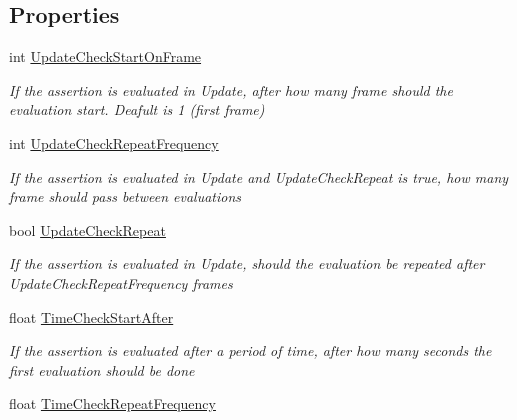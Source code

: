 \subsection*{Properties}
\begin{DoxyCompactItemize}
\item 
int \hyperlink{interface_unity_test_1_1_i_assertion_component_configurator_a315274f8d878046f66d7c3c6edd7066d}{Update\+Check\+Start\+On\+Frame}
\begin{DoxyCompactList}\small\item\em If the assertion is evaluated in Update, after how many frame should the evaluation start. Deafult is 1 (first frame) \end{DoxyCompactList}\item 
int \hyperlink{interface_unity_test_1_1_i_assertion_component_configurator_a1672eab17d77e0bb23584f47d0ed7ff4}{Update\+Check\+Repeat\+Frequency}
\begin{DoxyCompactList}\small\item\em If the assertion is evaluated in Update and Update\+Check\+Repeat is true, how many frame should pass between evaluations \end{DoxyCompactList}\item 
bool \hyperlink{interface_unity_test_1_1_i_assertion_component_configurator_afef9c91147b764223f81311095bd00d6}{Update\+Check\+Repeat}
\begin{DoxyCompactList}\small\item\em If the assertion is evaluated in Update, should the evaluation be repeated after Update\+Check\+Repeat\+Frequency frames \end{DoxyCompactList}\item 
float \hyperlink{interface_unity_test_1_1_i_assertion_component_configurator_a0df0159e613b972021d83e37955d6f63}{Time\+Check\+Start\+After}
\begin{DoxyCompactList}\small\item\em If the assertion is evaluated after a period of time, after how many seconds the first evaluation should be done \end{DoxyCompactList}\item 
float \hyperlink{interface_unity_test_1_1_i_assertion_component_configurator_ae437b1b68454c9e0db119608c05e4b5e}{Time\+Check\+Repeat\+Frequency}

\end{DoxyCompactItemize}
